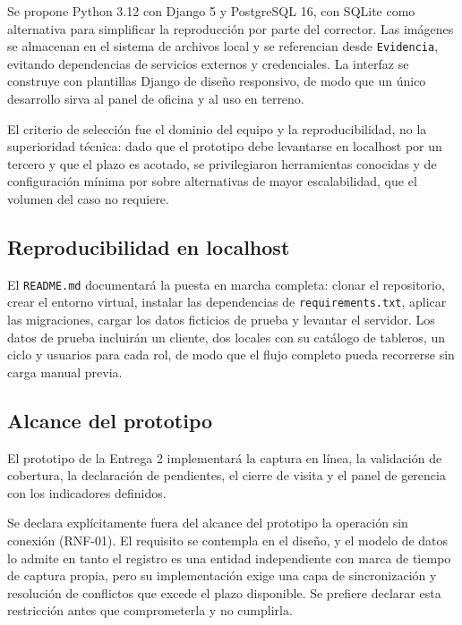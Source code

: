 \documentclass[10pt,letterpaper]{article}
\begin{document}
Se propone Python 3.12 con Django 5 y PostgreSQL 16, con SQLite como alternativa para
simplificar la reproducción por parte del corrector. Las imágenes se almacenan en el
sistema de archivos local y se referencian desde \texttt{Evidencia}, evitando
dependencias de servicios externos y credenciales. La interfaz se construye con
plantillas Django de diseño responsivo, de modo que un único desarrollo sirva al panel
de oficina y al uso en terreno.

El criterio de selección fue el dominio del equipo y la reproducibilidad, no la
superioridad técnica: dado que el prototipo debe levantarse en localhost por un
tercero y que el plazo es acotado, se privilegiaron herramientas conocidas y de
configuración mínima por sobre alternativas de mayor escalabilidad, que el volumen del
caso no requiere.

\subsection{Reproducibilidad en localhost}

El \texttt{README.md} documentará la puesta en marcha completa: clonar el repositorio,
crear el entorno virtual, instalar las dependencias de \texttt{requirements.txt},
aplicar las migraciones, cargar los datos ficticios de prueba y levantar el servidor.
Los datos de prueba incluirán un cliente, dos locales con su catálogo de tableros, un
ciclo y usuarios para cada rol, de modo que el flujo completo pueda recorrerse sin
carga manual previa.

\subsection{Alcance del prototipo}
\label{sec:alcance-prototipo}

El prototipo de la Entrega 2 implementará la captura en línea, la validación de
cobertura, la declaración de pendientes, el cierre de visita y el panel de gerencia
con los indicadores definidos.

Se declara explícitamente fuera del alcance del prototipo la operación sin conexión
(RNF-01). El requisito se contempla en el diseño, y el modelo de datos lo admite en
tanto el registro es una entidad independiente con marca de tiempo de captura propia,
pero su implementación exige una capa de sincronización y resolución de conflictos que
excede el plazo disponible. Se prefiere declarar esta restricción antes que
comprometerla y no cumplirla.
\end{document}
